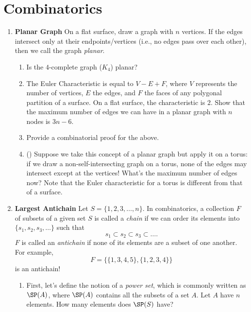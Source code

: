 \documentclass[11pt]{scrartcl}
\begin{document}
\section{Combinatorics}
\begin{enumerate}[label=\textbf{C\arabic*}.]
    \item \textbf{Planar Graph} \newline
    On a flat surface, draw a graph with $n$ vertices. If the edges intersect only at their endpoints/vertices (i.e., no edges pass over each other), then we call the graph \textit{planar}.
    
    \begin{enumerate}
        \item Is the $4$-complete graph ($K_4$) planar?
    
        \item The Euler Characteristic is equal to $V - E + F$, where $V$ represents the number of vertices, $E$ the edges, and $F$ the faces of any polygonal partition of a surface. On a flat surface, the characteristic is $2$. Show that the maximum number of edges we can have in a planar graph with $n$ nodes is $3n - 6$.
        
        \item Provide a combinatorial proof for the above.
        
        \item (\fullchili) Suppose we take this concept of a planar graph but apply it on a torus: if we draw a non-self-intersecting graph on a torus, none of the edges may intersect except at the vertices! What's the maximum number of edges now? Note that the Euler characteristic for a torus is different from that of a surface.
    \end{enumerate}
    
    \item \textbf{Largest Antichain} \newline
    Let $S = \{1, 2, 3, \dots, n\}$. In combinatorics, a collection $F$ of subsets of a given set $S$ is called a \textit{chain} if we can order its elements into $\{s_1, s_2, s_3, \dots\}$ such that
    \[ s_1 \subset s_2 \subset s_3 \subset \dots. \]
    $F$ is called an \textit{antichain} if none of its elements are a subset of one another. For example,
    \[ F = \{\{1, 3, 4, 5\}, \{1, 2, 3, 4\}\} \]
    is an antichain!
    
    \begin{enumerate}
        \item First, let's define the notion of a \textit{power set}, which is commonly written as $\SP(A)$, where $\SP(A)$ contains all the subsets of a set $A$. Let $A$ have $n$ elements. How many elements does $\SP(S)$ have?
        

\end{enumerate}
\end{enumerate}
\end{document}
